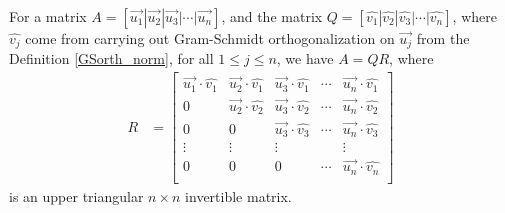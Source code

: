 \begin{proper}
For a matrix $A = [\vec{u_1}|\vec{u_2}|\vec{u_3}|\cdots|\vec{u_n}]$, and the matrix $Q =  [\hat{v_1}|\hat{v_2}|\hat{v_3}|\cdots|\hat{v_n}]$, where $\hat{v_j}$ come from carrying out Gram-Schmidt orthogonalization on $\vec{u_j}$ from the Definition \ref{GSorth_norm}, for all $1 \leq j \leq n$, we have $A = QR$, where
\begin{align*}
R &= 
\begin{bmatrix}
\vec{u_1} \cdot \hat{v_1} & \vec{u_2} \cdot \hat{v_1} & \vec{u_3} \cdot \hat{v_1} & \cdots & \vec{u_n} \cdot \hat{v_1} \\
0 & \vec{u_2} \cdot \hat{v_2} & \vec{u_3} \cdot \hat{v_2} & \cdots & \vec{u_n} \cdot \hat{v_2} \\
0 & 0 & \vec{u_3} \cdot \hat{v_3} & \cdots & \vec{u_n} \cdot \hat{v_3} \\
\vdots & \vdots & \vdots &  & \vdots\\
0 & 0 & 0 & \cdots & \vec{u_n} \cdot \hat{v_n}\\
\end{bmatrix}
\end{align*}
is an upper triangular $n \times n$ invertible matrix.

\end{proper}
